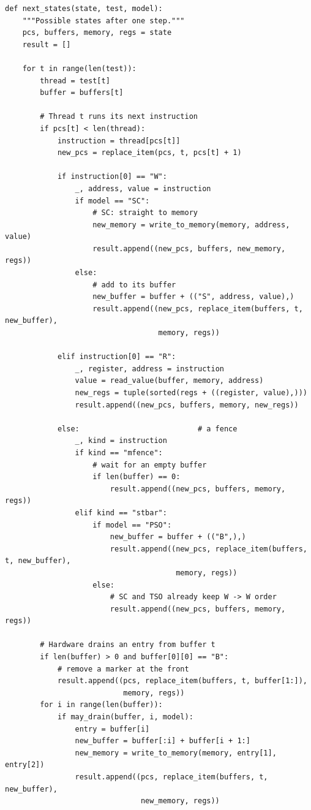 \begin{lstlisting}[style=vspython]
def next_states(state, test, model):
    """Possible states after one step."""
    pcs, buffers, memory, regs = state
    result = []

    for t in range(len(test)):
        thread = test[t]
        buffer = buffers[t]

        # Thread t runs its next instruction
        if pcs[t] < len(thread):
            instruction = thread[pcs[t]]
            new_pcs = replace_item(pcs, t, pcs[t] + 1)

            if instruction[0] == "W":
                _, address, value = instruction
                if model == "SC":
                    # SC: straight to memory
                    new_memory = write_to_memory(memory, address, value)
                    result.append((new_pcs, buffers, new_memory, regs))
                else:
                    # add to its buffer
                    new_buffer = buffer + (("S", address, value),)
                    result.append((new_pcs, replace_item(buffers, t, new_buffer),
                                   memory, regs))

            elif instruction[0] == "R":
                _, register, address = instruction
                value = read_value(buffer, memory, address)
                new_regs = tuple(sorted(regs + ((register, value),)))
                result.append((new_pcs, buffers, memory, new_regs))

            else:                           # a fence
                _, kind = instruction
                if kind == "mfence":
                    # wait for an empty buffer
                    if len(buffer) == 0:
                        result.append((new_pcs, buffers, memory, regs))
                elif kind == "stbar":
                    if model == "PSO":
                        new_buffer = buffer + (("B",),)
                        result.append((new_pcs, replace_item(buffers, t, new_buffer),
                                       memory, regs))
                    else:
                        # SC and TSO already keep W -> W order
                        result.append((new_pcs, buffers, memory, regs))

        # Hardware drains an entry from buffer t
        if len(buffer) > 0 and buffer[0][0] == "B":
            # remove a marker at the front
            result.append((pcs, replace_item(buffers, t, buffer[1:]),
                           memory, regs))
        for i in range(len(buffer)):
            if may_drain(buffer, i, model):
                entry = buffer[i]
                new_buffer = buffer[:i] + buffer[i + 1:]
                new_memory = write_to_memory(memory, entry[1], entry[2])
                result.append((pcs, replace_item(buffers, t, new_buffer),
                               new_memory, regs))


\end{lstlisting}
